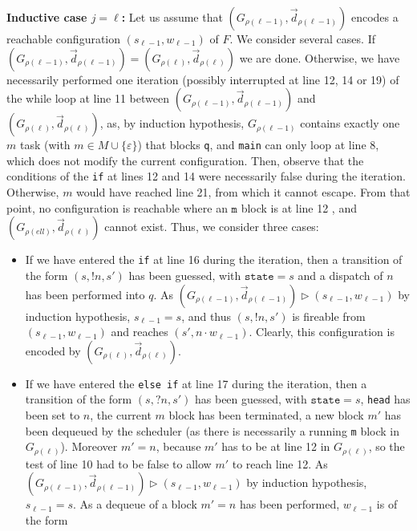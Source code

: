 \documentclass[runningheads,oribibl,]{article}
\newcommand{\e}{\ensuremath{\varepsilon}\xspace}
\newcommand{\Graph}{\ensuremath{G}}
\newcommand{\Data}{\ensuremath{\vec{d}}}
\newenvironment{proof}{\noindent{\it Proof.\hspace*{.5cm}}}{}
\begin{document}
\begin{proof}
  \textbf{Inductive case $j=\ell$:} Let us assume that
  $(\Graph_{\rho(\ell-1)},\Data_{\rho(\ell-1)})$ encodes a reachable
  configuration $(s_{\ell-1}, w_{\ell-1})$ of $F$. We consider several
  cases. If $(\Graph_{\rho(\ell-1)},\Data_{\rho(\ell-1)}) =
  (\Graph_{\rho(\ell)},\Data_{\rho(\ell)})$ we are done. Otherwise, we
  have necessarily performed one iteration (possibly interrupted at
  line 12, 14 or 19) of the while loop at line 11 between
  $(\Graph_{\rho(\ell-1)},\Data_{\rho(\ell-1)})$ and
  $(\Graph_{\rho(\ell)},\Data_{\rho(\ell)})$, as, by induction
  hypothesis, $\Graph_{\rho(\ell-1)}$ contains exactly one $m$ task
  (with $m\in M\cup\{\e\}$) that blocks \texttt{q}, and \texttt{main}
  can only loop at line 8, which does not modify the current
  configuration. Then, observe that the conditions of the \texttt{if}
  at lines 12 and 14 were necessarily false during the
  iteration. Otherwise, $m$ would have reached line 21, from which it
  cannot escape. From that point, no configuration is reachable where
  an $\mathtt{m}$ block is at line 12 , and $(\Graph_{\rho(ell)},
  \Data_{\rho(\ell)})$ cannot exist.  Thus, we consider three cases:
  \begin{itemize}
  \item If we have entered the \texttt{if} at line 16 during the
    iteration, then a transition of the form $(s,!n,s')$ has been
    guessed, with $\texttt{state}=s$ and a dispatch of $n$ has been
    performed into $q$. As
    $(\Graph_{\rho(\ell-1)},\Data_{\rho(\ell-1)})\rhd (s_{\ell-1},
    w_{\ell-1})$ by induction hypothesis, $s_{\ell-1}=s$, and thus
    $(s,!n,s')$ is fireable from $(s_{\ell-1}, w_{\ell-1})$ and reaches
    $(s',n\cdot w_{\ell-1})$. Clearly, this configuration is encoded
    by $(\Graph_{\rho(\ell)},\Data_{\rho(\ell)})$.
  \item If we have entered the \texttt{else if} at line 17 during the
    iteration, then a transition of the form $(s,?n,s')$ has been
    guessed, with $\texttt{state}=s$, \texttt{head} has been set to
    $n$, the current $m$ block has been terminated, a new block $m'$
    has been dequeued by the scheduler (as there is necessarily a
    running \texttt{m} block in $\Graph_{\rho(\ell)}$). Moreover
    $m'=n$, because $m'$ has to be at line 12 in
    $\Graph_{\rho(\ell)}$, so the test of line 10 had to be false to
    allow $m'$ to reach line 12. As
    $(\Graph_{\rho(\ell-1)},\Data_{\rho(\ell-1)})\rhd (s_{\ell-1},
    w_{\ell-1})$ by induction hypothesis, $s_{\ell-1}=s$. As a dequeue
    of a block $m'=n$ has been performed, $w_{\ell-1}$ is of the form

\end{itemize}
\end{proof}
\end{document}
